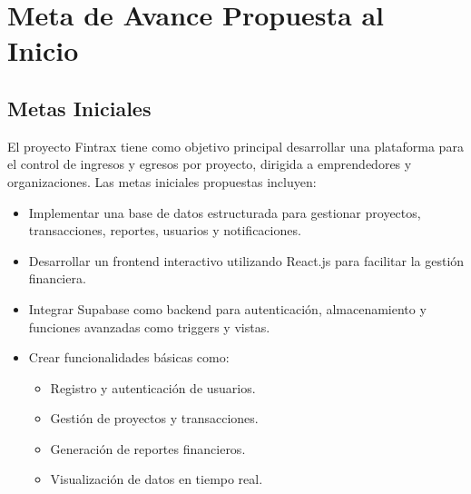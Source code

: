\section{Meta de Avance Propuesta al Inicio}

\subsection{Metas Iniciales}
El proyecto Fintrax tiene como objetivo principal desarrollar una plataforma para el control de ingresos y egresos por proyecto, dirigida a emprendedores y organizaciones. Las metas iniciales propuestas incluyen:
\begin{itemize}
    \item Implementar una base de datos estructurada para gestionar proyectos, transacciones, reportes, usuarios y notificaciones.
    \item Desarrollar un frontend interactivo utilizando React.js para facilitar la gestión financiera.
    \item Integrar Supabase como backend para autenticación, almacenamiento y funciones avanzadas como triggers y vistas.
    \item Crear funcionalidades básicas como:
    \begin{itemize}
        \item Registro y autenticación de usuarios.
        \item Gestión de proyectos y transacciones.
        \item Generación de reportes financieros.
        \item Visualización de datos en tiempo real.
    \end{itemize}
\end{itemize}

